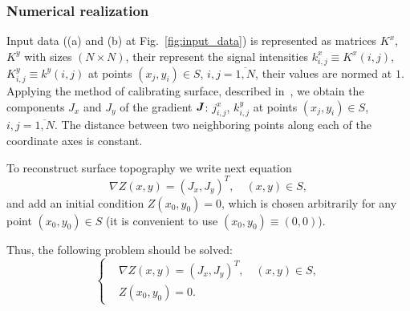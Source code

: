 \documentclass{beamer}
\begin{document}
\begin{frame}[c,allowframebreaks]
    \frametitle{Numerical realization}

    Input data ((a) and (b) at Fig.~\ref{fig:input_data}) is represented as matrices $K^x$, $K^y$
    with sizes $(N \times N)$, their represent the signal intensities $k^x_{i,j} \equiv K^x (i,j)$,
    $K^y_{i,j} \equiv k^y (i,j)$ at points $(x_j, y_i) \in S$, $i,j = \overline{1,N}$, their values
    are normed at $1$. Applying the method of calibrating surface, described in~\cite{main},
    we obtain the components $J_x$ and $J_y$ of the gradient ${\textbf{\emph{J}}}$: $j^x_{i,j}$,
    $k^y_{i,j}$ at points $(x_j, y_i) \in S$, $i,j = \overline{1,N}$.
    The distance between two neighboring points along each of the coordinate axes is constant.

    To reconstruct surface topography we write next equation
    $$ \nabla Z(x,y) = (J_x, J_y)^T, \quad (x,y)\in S,$$
    and add an initial condition $Z(x_0,y_0) = 0$, which is chosen arbitrarily for any point
    $(x_0,y_0) \in S$ (it is convenient to use $(x_0,y_0) \equiv (0,0)$).

    \framebreak

    Thus, the following problem should be solved:
    \begin{equation}
        \label{system_of_equations}
        \left\{
            \begin{aligned}
                &\nabla Z(x,y) = (J_x, J_y)^T, \quad (x,y)\in S, \\
                &Z(x_0,y_0) = 0.
            \end{aligned}
        \right.
    \end{equation}

    \framebreak


\end{frame}
\end{document}
